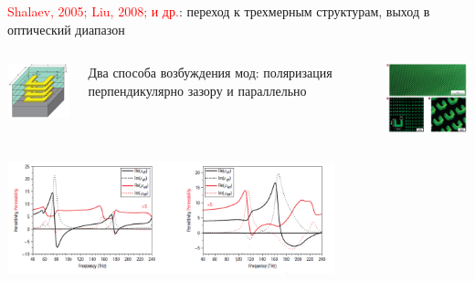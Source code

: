 \documentclass[9pt, compress, xcolor=table]{beamer}
\begin{document}
\begin{frame}{}

 \textcolor{red}{Shalaev, 2005; Liu, 2008; и др.}: переход к трехмерным структурам,
выход в оптический диапазон
\begin{columns}[c]
\column{6cm}
\begin{center}
\includegraphics[width=3cm]{neg_ref_34}
\end{center}
Два способа возбуждения мод: поляризация перпендикулярно зазору и параллельно

\column{6cm}
\begin{center}
\includegraphics[width=4cm]{neg_ref_36}
\end{center}
\end{columns}
\begin{center}
\includegraphics[width=9.5cm]{neg_ref_37}
\end{center}

\end{frame}
\end{document}
